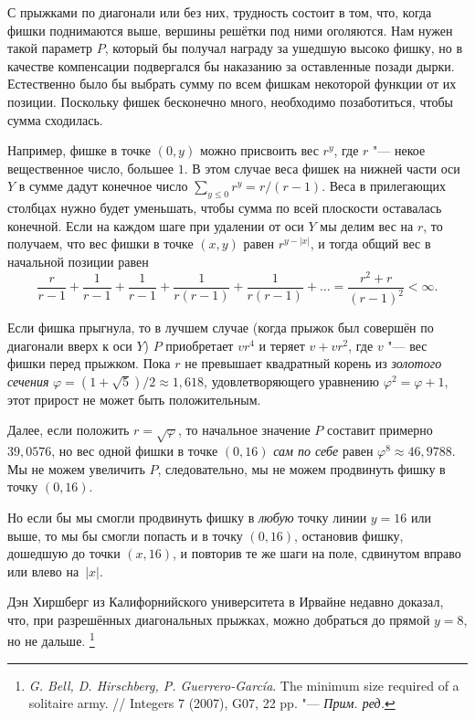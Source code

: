 \documentclass[twoside]{book}
\begin{document}
\medskip

С прыжками по диагонали или без них, трудность состоит в том, что, когда фишки поднимаются выше, вершины решётки под ними оголяются.
Нам нужен такой параметр $P$, который бы получал награду за ушедшую высоко фишку, но в качестве компенсации подвергался бы наказанию за оставленные позади дырки.
Естественно было бы выбрать сумму по всем фишкам некоторой функции от их позиции.
Поскольку фишек бесконечно много, необходимо позаботиться, чтобы сумма сходилась.

Например, фишке в точке $(0, y)$ можно присвоить вес $r^y$, где $r$ "--- некое вещественное число, большее $1$.
В этом случае веса фишек на нижней части оси $Y$ в сумме дадут конечное число $\sum_{y\le 0}r^y = r/(r-1)$.
Веса в прилегающих столбцах нужно будет уменьшать, чтобы сумма по всей плоскости оставалась конечной.
Если на каждом шаге при удалении от оси $Y$ мы делим вес на $r$, то получаем, что вес фишки в точке $(x, y)$ равен $r^{y - |x|}$, и тогда общий вес в начальной позиции равен
\[\frac r{r-1} + \frac 1{r-1} +\frac 1{r-1} +\frac 1{r(r-1)} +\frac 1{r(r-1)} + \ldots =\frac{r^2+r}{(r-1)^2} <\infty.\]

Если фишка прыгнула, то в лучшем случае (когда прыжок был совершён по диагонали вверх к оси $Y$) $P$ приобретает $vr^4$ и теряет $v+vr^2$, где $v$ "--- вес фишки перед прыжком.
Пока $r$ не превышает квадратный корень из \emph{золотого сечения} $\varphi=(1+\sqrt5)/2\approx 1{,}618$, удовлетворяющего уравнению $\varphi^2=\varphi+1$, этот прирост не может быть положительным.

Далее, если положить $r = \sqrt{\varphi}$, то начальное значение $P$ составит примерно $39{,}0576$, но вес одной фишки в точке $(0, 16)$ \emph{сам по себе} равен $\varphi^8\approx 46{,}9788$.
Мы не можем увеличить $P$, следовательно, мы не можем продвинуть фишку в точку $(0, 16)$.

Но если бы мы смогли продвинуть фишку в \emph{любую} точку линии $y = 16$ или выше, то мы бы смогли попасть и в точку $(0, 16)$, остановив фишку, дошедшую до точки $(x, 16)$, и повторив те же шаги на поле, сдвинутом вправо или влево на~$|x|$.
\heart

Дэн Хиршберг из Калифорнийского университета в Ирвайне недавно доказал, что, при разрешённых диагональных прыжках, можно добраться до прямой $y=8$, но не дальше.%
\footnote{\emph{G. Bell, D. Hirschberg, P. Guerrero-García}.
The minimum size required of a solitaire army. 
/\!/
Integers 7 (2007), G07, 22 pp. "--- \emph{Прим. ред.}}
\end{document}
